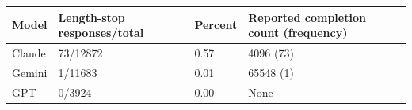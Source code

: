 \begin{tabular}{llll}
\hline
Model & Length-stop responses/total & Percent & Reported completion count (frequency) \\
\hline
Claude & 73/12872 & 0.57 & 4096 (73) \\
Gemini & 1/11683 & 0.01 & 65548 (1) \\
GPT & 0/3924 & 0.00 & None \\
\hline
\end{tabular}
